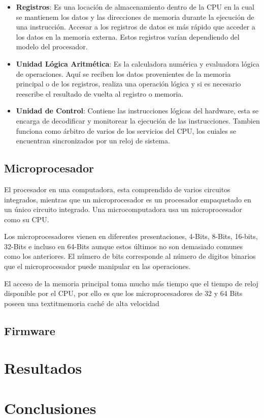 \documentclass[letterpaper,12pt,oneside]{book}
\begin{document}
				\begin{itemize}
					\item \textbf{Registros}: Es una locación de almacenamiento dentro de la CPU en la cual se mantienem los datos y las direcciones de memoria durante la ejecución de una instrucción. Accesar a los registros de datos es más rápido que acceder a los datos en la memoria externa. Estos registros varían dependiendo del modelo del procesador.

					\item \textbf{Unidad Lógica Aritmética}: Es la calculadora numérica y evaluadora lógica de operaciones. Aquí se reciben los datos provenientes de la memoria principal o de los registros, realiza una operación lógica y si es necesario reescribe el resultado de vuelta al registro o memoria.

					\item \textbf{Unidad de Control}: Contiene las instrucciones lógicas del hardware, esta se encarga de decodificar y monitorear la ejecución de las instrucciones. Tambien funciona como árbitro de varios de los servicios del CPU, los cuiales se encuentran sincronizados por un reloj de sistema.
				\end{itemize}
	
	\section{Microprocesador}
		El procesador en una computadora, esta comprendido de varios circuitos integrados, mientras que un microprocesador es un procesador empaquetado en un único circuito integrado. Una microcomputadora usa un microprocesador como su CPU.

		Los microprocesadores vienen en diferentes presentaciones, 4-Bits, 8-Bits, 16-bits, 32-Bits e incluso en 64-Bits aunque estos últimos no son demasiado comunes como los anteriores. El número de bits corresponde al número de digitos binarios que el microprocesador puede manipular en las operaciones.

		El acceso de la memoria principal toma mucho más tiempo que el tiempo de reloj disponible por el CPU, por ello es que los microprocesadores de 32 y 64 Bits poseen una textit{memoria caché} de alta velocidad

	\section{Firmware}

	\chapter{Resultados}

	\chapter{Conclusiones}


	\backmatter%
\end{document}
